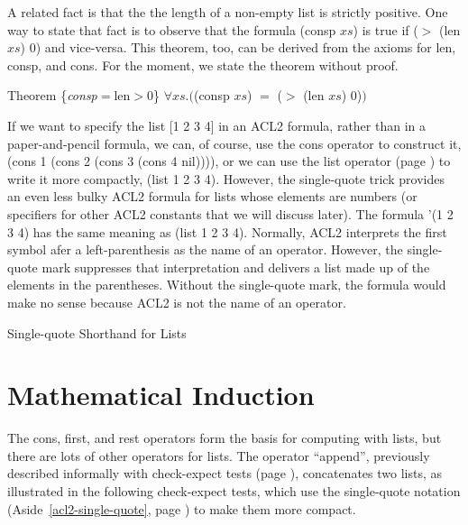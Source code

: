 A related fact is that the the length of a non-empty list is strictly positive.
One way to state that fact is to observe that the formula (consp $xs$) is true
if ($>$ (len $xs$) 0) and vice-versa. %
This theorem, too, can be derived from the axioms for
len, consp, and cons. For the moment,
we state the theorem without proof.
\begin{samepage}
\label{consp-len-thm}
\begin{center}
Theorem \{\emph{consp}$=$len$>$0\} $\forall xs.($(consp $xs$) $=$ ($>$ (len $xs$) 0)$)$
\end{center}
\end{samepage}

\begin{aside}
If we want to specify the list [1 2 3 4] in an ACL2 formula,
rather than in a paper-and-pencil formula,
we can, of course, use the cons operator to construct it,
(cons 1 (cons 2 (cons 3 (cons 4 nil)))),
or we can use the list operator (page \pageref{list-op-informal}) to write it more compactly,
(list 1 2 3 4).
However, the single-quote trick provides an even less bulky ACL2 formula for lists
whose elements are numbers (or specifiers for other ACL2 constants that we will discuss later).
The formula
'(1 2 3 4) has the same meaning as (list 1 2 3 4).
Normally, ACL2 interprets the first symbol afer a left-parenthesis
as the name of an operator.
However, the single-quote mark suppresses that interpretation and
delivers a list made up of the elements in the parentheses.
Without the single-quote mark,
the formula would make no sense because ACL2 is not the name of an operator.
\caption{Single-quote Shorthand for Lists}
\label{acl2-single-quote}
\end{aside}

\section{Mathematical Induction}
\label{sec:induction}
The cons, first, and rest operators form the basis for computing with lists,
but there are lots of other operators for lists.
The operator ``append'', previously described informally with check-expect tests
(page \pageref{append-op-informal}), concatenates two lists, as illustrated
in the following check-expect tests,
which use the single-quote notation (Aside~\ref{acl2-single-quote}, page \pageref{acl2-single-quote})
to make them more compact.

